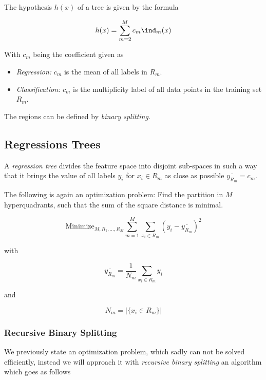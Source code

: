 The hypothesis \(h(x)\) of a tree is given by the formula 

\[
    h(x) = \sum_{m = 2}^{M} c_m \ind_m (x)
\]

With \(c_m\) being the coefficient given as 

\begin{itemize}
    \item \emph{Regression:} \(c_m\) is the mean of all labels in \(R_m\). 

    \item \emph{Classification:} \(c_m\) is the multiplicity label of all data points in the training set \(R_m\).
\end{itemize}

The regions can be defined by \emph{binary splitting}.

\subsection{Regressions Trees}

A \emph{regression tree} divides the feature space into disjoint sub-spaces in such a way that it brings
the value of all labels \(y_i\) for \(x_i \in R_m\) as close as possible \(\overline{y_{R_m}} = c_m\). 

The following is again an optimization problem: Find the partition in \(M\) hyperquadrants, such that the sum 
of the square distance is minimal. 

\[
    \text{Minimize}_{M, R_1, \dots, R_M} \sum_{m = 1}^{M} \sum_{x_i \in R_m} (y_i - \overline{y_{R_m}})^2
\]

with 

\[
    \overline{y_{R_m}} = \frac{1}{N_m} \sum_{x_i \in R_m} y_i
\]

and 

\[
    N_m = |\{x_i \in R_m\}|
\]

\subsubsection{Recursive Binary Splitting}

We previously state an optimization problem, which sadly can not be solved efficiently, instead 
we will approach it with \emph{recursive binary splitting} an algorithm which goes as follows 

